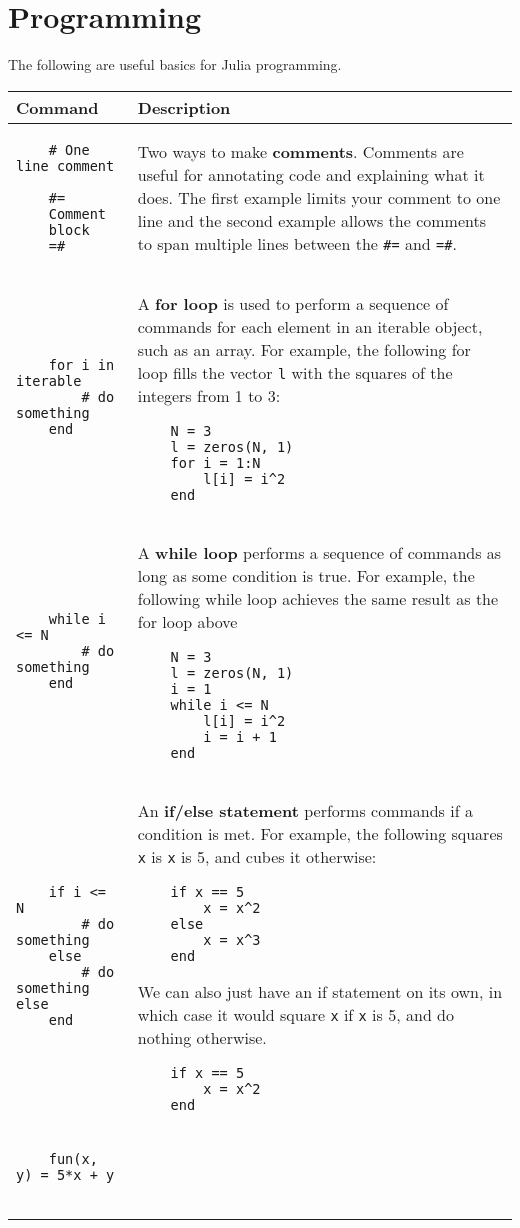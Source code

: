 \documentclass[]{article}
\begin{document}
\section{Programming}
The following are useful basics for Julia programming.
\begin{longtable}{ |m{6cm}  | m{11cm} |}
	\hline
	\textbf{Command} & \textbf{Description}
	\\\hline
	\begin{verbatim}
    # One line comment

    #=
    Comment 
    block
    =#
	\end{verbatim}
	& Two ways to make \textbf{comments}. Comments are useful for annotating
    code and explaining what it does. The first example limits your comment to
    one line and the second example allows the comments to span multiple lines
    between the \texttt{\#=} and \texttt{=\#}.
    \\\hline
\begin{verbatim}
    for i in iterable
        # do something
    end
	\end{verbatim}
	& A \textbf{for loop} is used to perform a sequence of commands for each
    element in an iterable object, such as an array. For example, the
    following for loop fills the vector \texttt{l} with the squares of the
    integers from 1 to 3:
    \begin{verbatim}
    N = 3
    l = zeros(N, 1)
    for i = 1:N
        l[i] = i^2
    end
    \end{verbatim}
    \\\hline
\begin{verbatim}
    while i <= N
        # do something
    end
	\end{verbatim}
	& A \textbf{while loop} performs a sequence of commands as long as some
    condition is true. For example, the
    following while loop achieves the same result as the for loop above
    \begin{verbatim}
    N = 3
    l = zeros(N, 1)
    i = 1
    while i <= N
        l[i] = i^2
        i = i + 1
    end
    \end{verbatim}
    \\\hline
\begin{verbatim}
    if i <= N
        # do something
    else
        # do something else
    end
	\end{verbatim}
	& An \textbf{if/else statement} performs commands if a condition is met. For example, the
    following squares \texttt{x} is \texttt{x} is 5, and cubes it otherwise:
    \begin{verbatim}
    if x == 5
        x = x^2
    else
        x = x^3
    end
    \end{verbatim}
    We can also just have an if statement on its own, in which case it would
    square \texttt{x} if \texttt{x} is 5, and do nothing otherwise.
    \begin{verbatim}
    if x == 5
        x = x^2
    end
    \end{verbatim}
    \\\hline
\begin{verbatim}
    fun(x, y) = 5*x + y


\end{verbatim}
\end{longtable}
\end{document}
